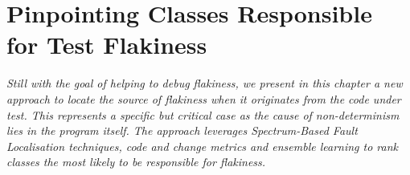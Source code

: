\chapter{Pinpointing Classes Responsible for Test Flakiness}
\label{chap:sherloc}

\setcounter{minitocdepth}{1}
\justifying
\textit{Still with the goal of helping to debug flakiness, we present in this chapter a new approach to locate the source of flakiness when it originates from the code under test. This represents a specific but critical case as the cause of non-determinism lies in the program itself. The approach leverages Spectrum-Based Fault Localisation techniques, code and change metrics and ensemble learning to rank classes the most likely to be responsible for flakiness.\\
}










